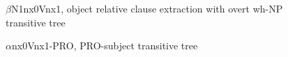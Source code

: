 \documentclass[11pt,a4paper]{article}
\begin{document}
\begin{figure}
\centering
{}
\caption{$\beta$N1nx0Vnx1, object relative clause extraction with overt wh-NP transitive tree}
\label{fig:relclause}
\end{figure}

\begin{figure}
\centering
{}
\caption{$\alpha$nx0Vnx1-PRO, PRO-subject transitive tree}
\label{fig:pro}
\end{figure}







%
%


\end{document}
